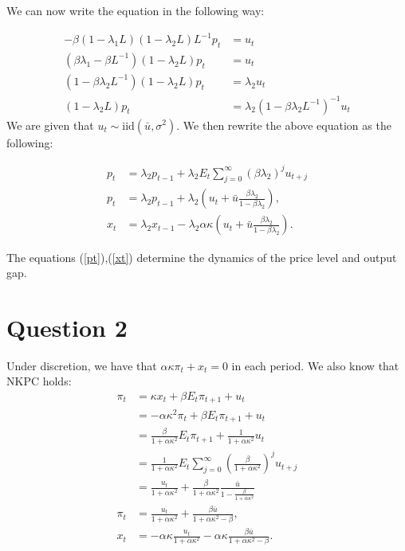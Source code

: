 \documentclass[11pt]{article} %
\begin{document}
We can now write the equation in the following way:

\begin{align*}
-\beta(1-\lambda_1L)(1-\lambda_2L)L^{-1}p_t &= u_t \\ %
(\beta\lambda_1 - \beta L^{-1})(1-\lambda_2L)p_t &= u_t \\
(1-\beta\lambda_2L^{-1})(1-\lambda_2L)p_t &= \lambda_2 u_t\\
(1-\lambda_2L)p_t &= \lambda_2 (1-\beta\lambda_2L^{-1})^{-1}u_t
\end{align*}
We are given that $u_t\sim \text{iid}(\bar{u},\sigma^2)$. We then rewrite the above equation as the following:

\begin{align}
p_t &= \lambda_2 p_{t-1} + \lambda_2 E_{t}\sum_{j=0}^{\infty}(\beta\lambda_2)^ju_{t+j} \nonumber \\
p_t &=\lambda_2 p_{t-1} +\lambda_2\left(u_t + \bar{u}\frac{\beta\lambda_2}{1-\beta\lambda_2}\right), \label{pt} \\
x_t &= \lambda_2 x_{t-1} - \lambda_2 \alpha \kappa \left(u_t + \bar{u}\frac{\beta\lambda_2}{1-\beta\lambda_2}\right). \label{xt}
\end{align}

The equations (\ref{pt}),(\ref{xt}) determine the dynamics of the price level and output gap.
\section{Question 2}
Under discretion, we have that $\alpha \kappa \pi_t + x_t = 0$ in each period. We also know that NKPC holds:
\begin{align*}
\pi_t &= \kappa x_t + \beta E_t \pi_{t+1} + u_t\\
&= -\alpha\kappa^2 \pi_t + \beta E_t \pi_{t+1} + u_t\\
&=  \frac{\beta}{1+\alpha\kappa^2} E_t \pi_{t+1} + \frac{1}{1+\alpha\kappa^2}u_t \\
&= \frac{1}{1+\alpha \kappa^2}E_t\sum_{j=0}^{\infty} \left( \frac{\beta}{1+\alpha\kappa^2} \right)^{j} u_{t+j}\\
&= \frac{u_t}{1+\alpha\kappa^2} +  \frac{\beta}{1+\alpha\kappa^2} \frac{\bar{u}}{1- \frac{\beta}{1+\alpha\kappa^2}}\\
\pi_t &= \frac{u_t}{1+\alpha\kappa^2} + \frac{\beta\bar{u}}{1+\alpha\kappa^2 - \beta},\\
x_t &= -\alpha \kappa \frac{u_t}{1+\alpha\kappa^2} - \alpha \kappa \frac{\beta\bar{u}}{1+\alpha\kappa^2 - \beta}.
\end{align*}
\end{document}
